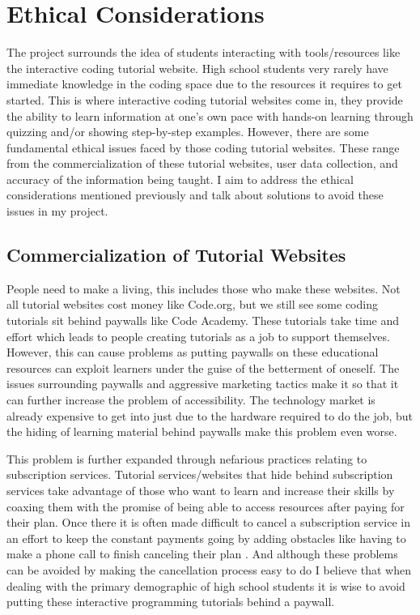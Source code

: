 \documentclass[10pt,twocolumn]{article}
\begin{document}
\section{Ethical Considerations}
The project surrounds the idea of students interacting with tools/resources like the interactive coding tutorial website. High school students very rarely have immediate knowledge in the coding space due to the resources it requires to get started. This is where interactive coding tutorial websites come in, they provide the ability to learn information at one's own pace with hands-on learning through quizzing and/or showing step-by-step examples. However, there are some fundamental ethical issues faced by those coding tutorial websites. These range from the commercialization of these tutorial websites, user data collection, and accuracy of the information being taught. I aim to address the ethical considerations mentioned previously and talk about solutions to avoid these issues in my project. 

\subsection{Commercialization of Tutorial Websites}
People need to make a living, this includes those who make these websites. Not all tutorial websites cost money like Code.org, but we still see some coding tutorials sit behind paywalls like Code Academy. These tutorials take time and effort which leads to people creating tutorials as a job to support themselves. However, this can cause problems as putting paywalls on these educational resources can exploit learners under the guise of the betterment of oneself. The issues surrounding paywalls and aggressive marketing tactics make it so that it can further increase the problem of accessibility. The technology market is already expensive to get into just due to the hardware required to do the job, but the hiding of learning material behind paywalls make this problem even worse. 

This problem is further expanded through nefarious practices relating to subscription services. Tutorial services/websites that hide behind subscription services take advantage of those who want to learn and increase their skills by coaxing them with the promise of being able to access resources after paying for their plan. Once there it is often made difficult to cancel a subscription service in an effort to keep the constant payments going by adding obstacles like having to make a phone call to finish canceling their plan \cite{sheil_staying_2024}. And although these problems can be avoided by making the cancellation process easy to do I believe that when dealing with the primary demographic of high school students it is wise to avoid putting these interactive programming tutorials behind a paywall.
\end{document}
